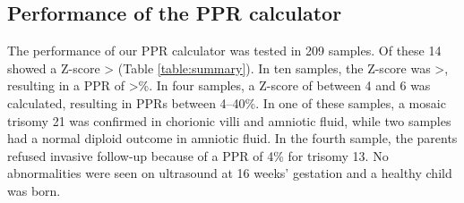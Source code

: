 \subsection{Performance of the PPR calculator}
The performance of our PPR calculator was tested in 209 samples. 
Of these 14 showed a Z-score \textgreater{} (Table \ref{table:summary}). In ten samples, the Z-score was \textgreater{}, resulting in a PPR of \textgreater{}\%. In four samples, a Z-score of between 4 and 6 was calculated, resulting in PPRs between 4–40\%. 
In one of these samples, a mosaic trisomy 21 was confirmed in chorionic villi and amniotic fluid, while two samples had a normal diploid outcome in amniotic fluid. 
In the fourth sample, the parents refused invasive follow-up because of a PPR of 4\% for trisomy 13. 
No abnormalities were seen on ultrasound at 16 weeks’ gestation and a healthy child was born.

